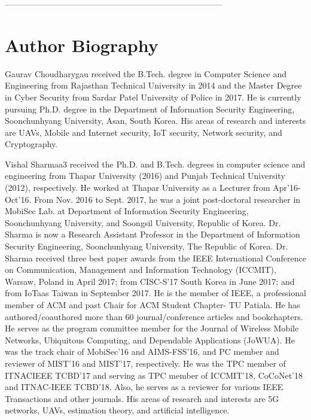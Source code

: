 \documentclass{easychair}
\begin{document}
%
\label{sect:bib}


------------------------------------------------------------------------------
\section*{Author Biography}
\vspace*{1em}
\begin{biography}{Gaurav Choudhary}{gau} received the B.Tech. degree in Computer Science and Engineering from Rajasthan Technical University in 2014 and the Master Degree in Cyber Security from Sardar Patel University of Police in 2017. He is currently pursuing Ph.D. degree in the Department of Information Security Engineering, Soonchunhyang University, Asan, South Korea. His areas of research and interests are UAVs, Mobile and Internet security, IoT security, Network security, and Cryptography.
\end{biography}
\vspace*{1em}
\begin{biography}{Vishal Sharma}{a3} received the Ph.D. and B.Tech. degrees in computer science and engineering from Thapar University (2016) and Punjab Technical University (2012), respectively. He worked at Thapar University as a Lecturer from Apr’16-Oct’16. From Nov. 2016 to Sept. 2017, he was a joint post-doctoral researcher in MobiSec Lab. at Department of Information Security Engineering, Soonchunhyang University, and Soongsil University, Republic of Korea. Dr. Sharma is now a Research Assistant Professor in the Department of Information Security Engineering, Soonchunhyang University, The Republic of Korea. Dr. Sharma received three best paper awards from the IEEE International Conference on Communication, Management and Information Technology (ICCMIT), Warsaw, Poland in April 2017; from CISC-S’17 South Korea in June 2017; and from IoTaas Taiwan in September 2017. He is the member of IEEE, a professional member of ACM and past Chair for ACM Student Chapter- TU Patiala. He has authored/coauthored more than 60 journal/conference articles and bookchapters. He serves as the program committee member for the Journal of Wireless Mobile Networks, Ubiquitous Computing, and Dependable Applications (JoWUA). He was the track chair of MobiSec’16 and AIMS-FSS’16, and PC member and reviewer of MIST’16 and MIST’17, respectively. He was the TPC member of ITNACIEEE TCBD’17 and serving as TPC member of ICCMIT’18, CoCoNet’18 and ITNAC-IEEE TCBD’18. Also, he serves as a reviewer for various IEEE Transactions and other journals. His areas of research and interests are 5G networks, UAVs, estimation theory, and artificial intelligence.
\end{biography}
\end{document}
